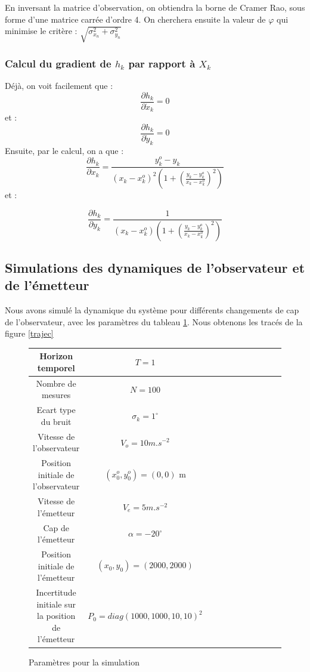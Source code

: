 \documentclass{article}
\begin{document}
En inversant la matrice d'observation, on obtiendra la borne de Cramer Rao, sous forme d'une matrice carrée d'ordre 4.
On cherchera ensuite la valeur de $\varphi$ qui minimise le critère : $\sqrt{\sigma_{x_{n}}^{2}+\sigma_{y_{n}}^{2}}$

\subsubsection{Calcul du gradient de $h_{k}$ par rapport à $X_{k}$}
Déjà, on voit facilement que : 
\[\frac{\partial h_{k}}{\partial \dot{x}_{k}} = 0 \] et :
\[\frac{\partial h_{k}}{\partial \dot{y}_{k}} = 0 \]
Ensuite, par le calcul, on a que : 
\[\frac{\partial h_{k}}{\partial x_{k}}=\frac{y_{k}^{o}-y_{k}}{\left(x_{k}-x_{k}^{o}\right)^{2}\left(1+\left(\frac{y_{k}-y_{k}^{o}}{x_{k}-x_{k}^{o}}\right)^{2}\right)}\]
et :

\[\frac{\partial h_{k}}{\partial y_{k}}= \frac{1}{\left(x_{k}-x_{k}^{o}\right)\left(1+\left( \frac{y_{k}-y_{k}^{o}}{x_{k}-x_{k}^{o}}  \right)^{2}\right)}\]
\subsection{Simulations des dynamiques de l'observateur et de l'émetteur}
Nous avons simulé la dynamique du système pour différents changements de cap de l'observateur, avec les paramètres du tableau \ref{paramètres}.
 Nous obtenons les tracés de la figure \ref{trajec}


\begin{figure}[h!]
  \centering
  \caption{Paramètres pour la simulation}
  \label{paramètres}
  \begin{tabular}{|*{11}{c|}}
    \hline Horizon temporel & $T = 1$ \\
    \hline Nombre de mesures  & $N=100$ \\
    \hline Ecart type du bruit & $\sigma_{k}=1^{\circ}$\\
    \hline Vitesse de l'observateur & $V_{o}=10 m.s^{-2}$\\
    \hline Position initiale de l'observateur &  $(x_{0}^{o},y_{0}^{o})=(0,0)$ m\\
    \hline Vitesse de l'émetteur & $V_{e} = 5 m.s^{-2}$\\
    \hline Cap de l'émetteur & $\alpha =-20^{\circ}$\\
    \hline Position initiale de l'émetteur & $(x_{0},y_{0})=(2000,2000)$\\
    \hline Incertitude initiale sur la position de l'émetteur & $P_{0}=diag(1000,1000,10,10)^{2}$\\
    \hline
  \end{tabular}
\end{figure}
\end{document}

